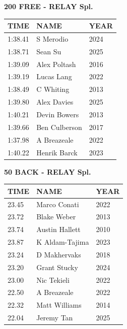 \begin{table}[H]
\centering
\begin{minipage}[t]{0.6\textwidth}
\centering
\textbf{200 FREE - RELAY Spl.}\\[0.1cm]
\begin{tabular}{@{}p{1.8cm}p{2.8cm}p{1.2cm}@{}}
\hline
    \textbf{TIME} & \textbf{NAME} & \textbf{YEAR} \\
\hline
    1:38.41 & S Merodio & 2024 \\
    1:38.71 & Sean Su & 2025 \\
    1:39.09 & Alex Poltash & 2016 \\
    1:39.19 & Lucas Lang & 2022 \\
    1:38.49 & C Whiting & 2013 \\
    1:39.80 & Alex Davies & 2025 \\
    1:40.21 & Devin Bowers & 2013 \\
    1:39.66 & Ben Culberson & 2017 \\
    1:37.98 & A Breazeale & 2022 \\
    1:40.22 & Henrik Barck & 2023 \\
\hline
\end{tabular}
\end{minipage}
\end{table}

\begin{table}[H]
\centering
\begin{minipage}[t]{0.6\textwidth}
\centering
\textbf{50 BACK - RELAY Spl.}\\[0.1cm]
\begin{tabular}{@{}p{1.8cm}p{2.8cm}p{1.2cm}@{}}
\hline
    \textbf{TIME} & \textbf{NAME} & \textbf{YEAR} \\
\hline
    23.45 & Marco Conati & 2022 \\
    23.72 & Blake Weber & 2013 \\
    23.74 & Austin Hallett & 2010 \\
    23.87 & K Aldam-Tajima & 2023 \\
    23.24 & D Makhervaks & 2018 \\
    23.20 & Grant Stucky & 2024 \\
    23.00 & Nic Tekieli & 2022 \\
    22.50 & A Breazeale & 2022 \\
    22.32 & Matt Williams & 2014 \\
    22.04 & Jeremy Tan & 2025 \\
\hline
\end{tabular}
\end{minipage}
\end{table}

